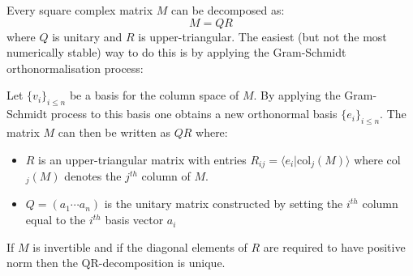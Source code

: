 	\begin{method}[QR Decomposition]
		Every square complex matrix $M$ can be decomposed as:
		\begin{equation}
			M = QR
		\end{equation}
		where $Q$ is unitary and $R$ is upper-triangular. The easiest (but not the most numerically stable) way to do this is by applying the Gram-Schmidt orthonormalisation process:
		
		Let $\{v_i\}_{i\leq n}$ be a basis for the column space of $M$. By applying the Gram-Schmidt process to this basis one obtains a new orthonormal basis $\{e_i\}_{i\leq n}$. The matrix $M$ can then be written as $QR$ where:
		\begin{itemize}
			\item $R$ is an upper-triangular matrix with entries $R_{ij} = \langle e_i|\text{col}_j(M) \rangle$ where col$_j(M)$ denotes the $j^{th}$ column of $M$.
			\item $Q = (a_1\cdots a_n)$ is the unitary matrix constructed by setting the $i^{th}$ column equal to the $i^{th}$ basis vector $a_i$ 
		\end{itemize}
	\end{method}
	\begin{property}
		If $M$ is invertible and if the diagonal elements of $R$ are required to have positive norm then the QR-decomposition is unique.
	\end{property}
